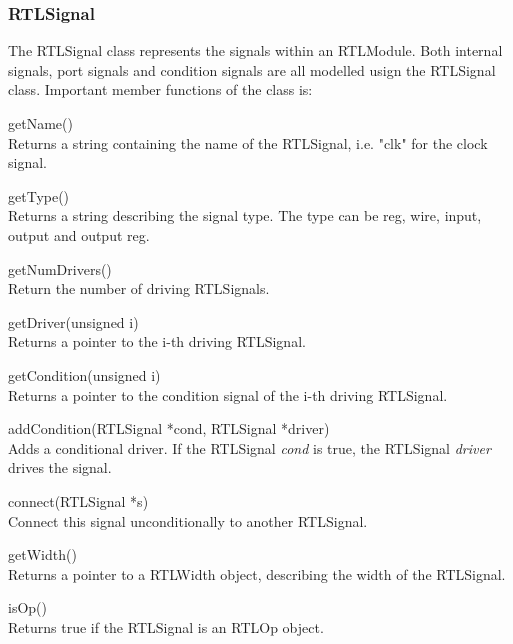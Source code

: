 \subsubsection{RTLSignal}
The RTLSignal class represents the signals within an RTLModule. Both internal signals, port signals and condition signals are all modelled usign the RTLSignal class. Important member functions of the class is:
\begin{compactdesc}
    \item[getName()] \hfill \\
    Returns a string containing the name of the RTLSignal, i.e. "clk" for the clock signal.
    \item[getType()] \hfill \\
    Returns a string describing the signal type. The type can be reg, wire, input, output and output reg.
    \item[getNumDrivers()] \hfill \\
    Return the number of driving RTLSignals. 
    \item[getDriver(unsigned i)] \hfill \\
    Returns a pointer to the i-th driving RTLSignal.
    \item[getCondition(unsigned i)] \hfill \\
    Returns a pointer to the condition signal of the i-th driving RTLSignal.
    \item[addCondition(RTLSignal *cond, RTLSignal *driver)] \hfill \\
    Adds a conditional driver. If the RTLSignal \textit{cond} is true, the RTLSignal \textit{driver} drives the signal. 
    \item[connect(RTLSignal *s)] \hfill \\
    Connect this signal unconditionally to another RTLSignal.
    \item[getWidth()] \hfill \\
    Returns a pointer to a RTLWidth object, describing the width of the RTLSignal.
    \item[isOp()] \hfill \\
    Returns true if the RTLSignal is an RTLOp object.
\end{compactdesc}
